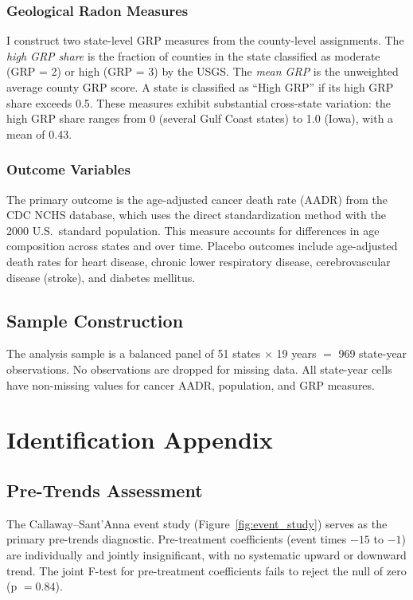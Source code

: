 \documentclass[12pt]{article}
\begin{document}
\subsubsection*{Geological Radon Measures} I construct two state-level GRP measures from the county-level assignments. The \textit{high GRP share} is the fraction of counties in the state classified as moderate (GRP = 2) or high (GRP = 3) by the USGS. The \textit{mean GRP} is the unweighted average county GRP score. A state is classified as ``High GRP'' if its high GRP share exceeds 0.5. These measures exhibit substantial cross-state variation: the high GRP share ranges from 0 (several Gulf Coast states) to 1.0 (Iowa), with a mean of 0.43.

\subsubsection*{Outcome Variables} The primary outcome is the age-adjusted cancer death rate (AADR) from the CDC NCHS database, which uses the direct standardization method with the 2000 U.S.\ standard population. This measure accounts for differences in age composition across states and over time. Placebo outcomes include age-adjusted death rates for heart disease, chronic lower respiratory disease, cerebrovascular disease (stroke), and diabetes mellitus.

\subsection{Sample Construction}

The analysis sample is a balanced panel of 51 states $\times$ 19 years $=$ 969 state-year observations. No observations are dropped for missing data. All state-year cells have non-missing values for cancer AADR, population, and GRP measures.

\section{Identification Appendix}

\subsection{Pre-Trends Assessment}

The Callaway--Sant'Anna event study (Figure~\ref{fig:event_study}) serves as the primary pre-trends diagnostic. Pre-treatment coefficients (event times $-15$ to $-1$) are individually and jointly insignificant, with no systematic upward or downward trend. The joint F-test for pre-treatment coefficients fails to reject the null of zero (p $= 0.84$).
\end{document}
